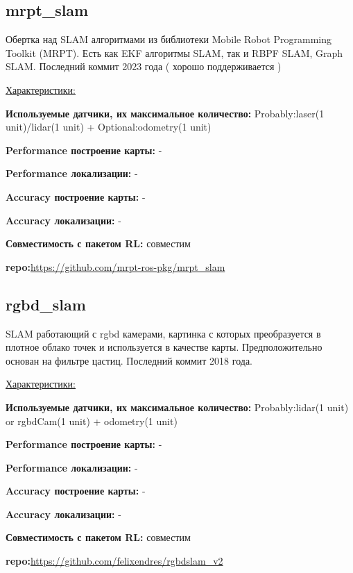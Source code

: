 \documentclass[a4paper, 14pt]{extreport}
\begin{document}
\subsection{mrpt\_slam}
\par Обертка над SLAM алгоритмами из библиотеки Mobile Robot Programming Toolkit (MRPT). Есть как EKF алгоритмы SLAM, так и RBPF SLAM, Graph SLAM. Последний коммит 2023 года ( хорошо поддерживается )
\vspace{2mm}
\par\noindent \underline{Характеристики:}
\par\textbf{Используемые датчики, их максимальное количество:} Probably:laser(1 unit)/lidar(1 unit) + Optional:odometry(1 unit)
\par\textbf{Performance построение карты:} -
\par\textbf{Performance локализации:} -
\par\textbf{Accuracy построение карты:} -
\par\textbf{Accuracy локализации:} -
\par\textbf{Совместимость с пакетом RL:} совместим
\par\textbf{repo:}\url{https://github.com/mrpt-ros-pkg/mrpt_slam}
\subsection{rgbd\_slam}
\par SLAM работающий с rgbd камерами, картинка с которых преобразуется в плотное облако точек и используется в качестве карты. Предположительно основан на фильтре цастиц. Последний коммит 2018 года.
\vspace{2mm}
\par\noindent \underline{Характеристики:}
\par\textbf{Используемые датчики, их максимальное количество:} Probably:lidar(1 unit) or rgbdCam(1 unit) + odometry(1 unit)
\par\textbf{Performance построение карты:} -
\par\textbf{Performance локализации:} -
\par\textbf{Accuracy построение карты:} -
\par\textbf{Accuracy локализации:} -
\par\textbf{Совместимость с пакетом RL:} совместим
\par\textbf{repo:}\url{https://github.com/felixendres/rgbdslam_v2}
\end{document}
